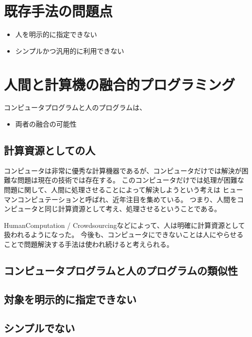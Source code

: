 \section{既存手法の問題点}\label{ux65e2ux5b58ux624bux6cd5ux306eux554fux984cux70b9}

\begin{itemize}
\itemsep1pt\parskip0pt
\item
  人を明示的に指定できない
\item
  シンプルかつ汎用的に利用できない
\end{itemize}

\section{人間と計算機の融合的プログラミング}\label{ux4ebaux9593ux3068ux8a08ux7b97ux6a5fux306eux878dux5408ux7684ux30d7ux30edux30b0ux30e9ux30dfux30f3ux30b0}

コンピュータプログラムと人のプログラムは、

\begin{itemize}
\itemsep1pt\parskip0pt
\item
  両者の融合の可能性
\end{itemize}

\subsection{計算資源としての人}

コンピュータは非常に優秀な計算機器であるが、コンピュータだけでは解決が困難な問題は現在の技術では存在する。
このコンピュータだけでは処理が困難な問題に関して、人間に処理させることによって解決しようという考えは
ヒューマンコンピュテーション\cite{humancomputation}と呼ばれ、近年注目を集めている。
つまり、人間をコンピュータと同じ計算資源として考え、処理させるということである。

\cite{recaptcha}

HumanComputation /
Crowdsourcingなどによって、人は明確に計算資源として扱われるようになった。
今後も、コンピュータにできないことは人にやらせることで問題解決する手法は使われ続けると考えられる。

\subsection{コンピュータプログラムと人のプログラムの類似性}

\subsection{}

\subsection{対象を明示的に指定できない}

\subsection{シンプルでない}
